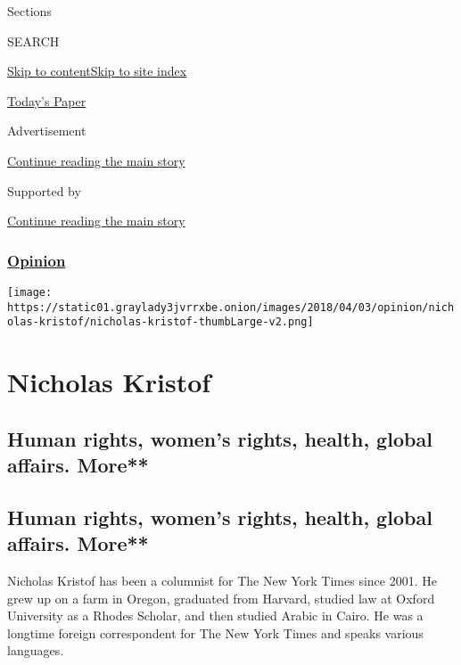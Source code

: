 Sections

SEARCH

\protect\hyperlink{site-content}{Skip to
content}\protect\hyperlink{site-index}{Skip to site index}

\href{https://myaccount.nytimes3xbfgragh.onion/auth/login?response_type=cookie\&client_id=vi}{}

\href{https://www.nytimes3xbfgragh.onion/section/todayspaper}{Today's
Paper}

Advertisement

\protect\hyperlink{after-top}{Continue reading the main story}

Supported by

\protect\hyperlink{after-sponsor}{Continue reading the main story}

\hypertarget{opinion}{%
\subsubsection{\texorpdfstring{\href{/section/opinion}{Opinion}}{Opinion}}\label{opinion}}

\texttt{[image: https://static01.graylady3jvrrxbe.onion/images/2018/04/03/opinion/nicholas-kristof/nicholas-kristof-thumbLarge-v2.png]}

\hypertarget{nicholas-kristof}{%
\section{Nicholas Kristof}\label{nicholas-kristof}}

\hypertarget{human-rights-womens-rights-health-global-affairs-more}{%
\subsection{Human rights, women's rights, health, global affairs.
More**}\label{human-rights-womens-rights-health-global-affairs-more}}

\hypertarget{human-rights-womens-rights-health-global-affairs-more-1}{%
\subsection{Human rights, women's rights, health, global affairs.
More**}\label{human-rights-womens-rights-health-global-affairs-more-1}}

Nicholas Kristof has been a columnist for The New York Times since 2001.
He grew up on a farm in Oregon, graduated from Harvard, studied law at
Oxford University as a Rhodes Scholar, and then studied Arabic in Cairo.
He was a longtime foreign correspondent for The New York Times and
speaks various languages.

